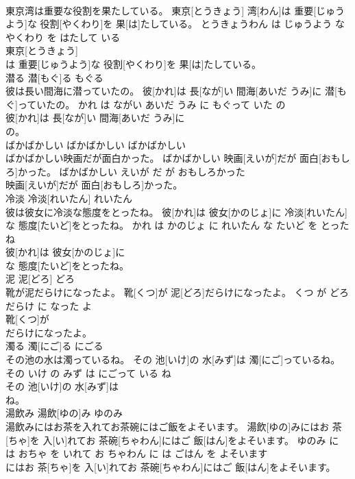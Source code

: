 \documentclass[8pt]{extreport}
\begin{document}
\begin{CJK}{UTF8}{min}
\\	東京湾は重要な役割を果たしている。	東京[とうきょう] 湾[わん]は 重要[じゅうよう]な 役割[やくわり]を 果[は]たしている。	とうきょうわん は じゅうよう な やくわり を はたして いる	
\\	東京[とうきょう]
\\	は 重要[じゅうよう]な 役割[やくわり]を 果[は]たしている。			
\\	潜る	潜[もぐ]る	もぐる	
\\	彼は長い間海に潜っていたの。	彼[かれ]は 長[なが]い 間海[あいだ うみ]に 潜[もぐ]っていたの。	かれ は ながい あいだ うみ に もぐって いた の	
\\	彼[かれ]は 長[なが]い 間海[あいだ うみ]に
\\	の。			
\\	ばかばかしい	ばかばかしい	ばかばかしい	
\\	ばかばかしい映画だが面白かった。	ばかばかしい 映画[えいが]だが 面白[おもしろ]かった。	ばかばかしい えいが だ が おもしろかった	
\\	映画[えいが]だが 面白[おもしろ]かった。			
\\	冷淡	冷淡[れいたん]	れいたん	
\\	彼は彼女に冷淡な態度をとったね。	彼[かれ]は 彼女[かのじょ]に 冷淡[れいたん]な 態度[たいど]をとったね。	かれ は かのじょ に れいたん な たいど を とった ね	
\\	彼[かれ]は 彼女[かのじょ]に
\\	な 態度[たいど]をとったね。			
\\	泥	泥[どろ]	どろ	
\\	靴が泥だらけになったよ。	靴[くつ]が 泥[どろ]だらけになったよ。	くつ が どろだらけ に なった よ	
\\	靴[くつ]が
\\	だらけになったよ。			
\\	濁る	濁[にご]る	にごる	
\\	その池の水は濁っているね。	その 池[いけ]の 水[みず]は 濁[にご]っているね。	その いけ の みず は にごって いる ね	
\\	その 池[いけ]の 水[みず]は
\\	ね。			
\\	湯飲み	湯飲[ゆの]み	ゆのみ	
\\	湯飲みにはお茶を入れてお茶碗にはご飯をよそいます。	湯飲[ゆの]みにはお 茶[ちゃ]を 入[い]れてお 茶碗[ちゃわん]にはご 飯[はん]をよそいます。	ゆのみ に は おちゃ を いれて お ちゃわん に は ごはん を よそいます	
\\	にはお 茶[ちゃ]を 入[い]れてお 茶碗[ちゃわん]にはご 飯[はん]をよそいます。			

\end{CJK}
\end{document}
